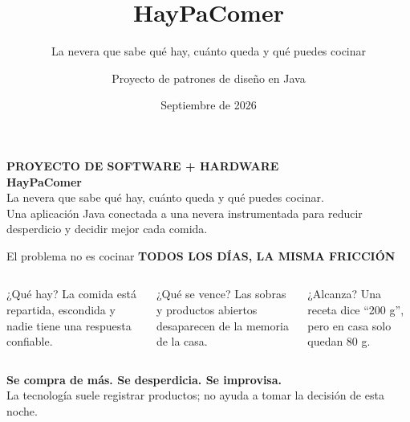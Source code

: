 \documentclass[aspectratio=169,11pt]{beamer}
\title{HayPaComer}
\subtitle{La nevera que sabe qué hay, cuánto queda y qué puedes cocinar}
\author{Proyecto de patrones de diseño en Java}
\institute{\tagline{DEL INVENTARIO A UNA DECISIÓN REAL}}
\date{Septiembre de 2026}
\newcommand{\tagline}[1]{{\color{mint}\footnotesize\bfseries #1}}
\begin{document}
{
\begin{frame}[plain]
\vspace{0.8cm}
\hspace{4.9cm}\begin{minipage}{0.62\textwidth}
{\tagline{PROYECTO DE SOFTWARE + HARDWARE}}\\[0.25cm]
{\color{cream}\fontsize{35}{39}\selectfont\bfseries HayPaComer}\\[0.18cm]
{\color{mint}\Large La nevera que sabe qué hay, cuánto queda y qué puedes cocinar.}\\[0.55cm]
{\color{muted}\large Una aplicación Java conectada a una nevera instrumentada para reducir desperdicio y decidir mejor cada comida.}
\end{minipage}
\end{frame}}

\begin{frame}{El problema no es cocinar}
\tagline{TODOS LOS DÍAS, LA MISMA FRICCIÓN}
\vspace{0.35cm}
\begin{columns}[T,onlytextwidth]
\begin{block}{\color{orange}¿Qué hay?}
La comida está repartida, escondida y nadie tiene una respuesta confiable.
\end{block}
\begin{block}{\color{orange}¿Qué se vence?}
Las sobras y productos abiertos desaparecen de la memoria de la casa.
\end{block}
\begin{block}{\color{orange}¿Alcanza?}
Una receta dice “200 g”, pero en casa solo quedan 80 g.
\end{block}
\end{columns}
\vfill
\begin{center}
{\color{cream}\Large\bfseries Se compra de más. Se desperdicia. Se improvisa.}\\[0.18cm]
{\color{muted}\large La tecnología suele registrar productos; no ayuda a tomar la decisión de esta noche.}
\end{center}
\end{frame}
\end{document}
